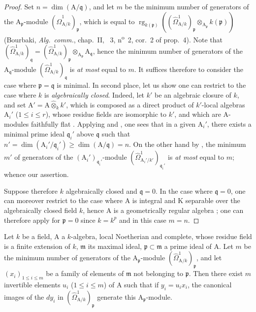 \begin{proof}
Set $n=\dim(\mathrm{A}/\mathfrak{q})$, and let $m$ be the minimum number of generators of the $\mathrm{A}_\mathfrak{p}$-module $(\hat{\Omega}^1_{\mathrm{A}/k})_\mathfrak{p}$, which is equal to $\operatorname{rg}_{k(\mathfrak{p})}((\hat{\Omega}^1_{\mathrm{A}/k})_\mathfrak{p}\otimes_{\mathrm{A}_\mathfrak{p}}k(\mathfrak{p}))$ (Bourbaki, \emph{Alg.\ comm.}, chap.~II, \textsection~3, n\textsuperscript{o}~2, cor.~2 of prop.~4).
Note that $(\hat{\Omega}^1_{\mathrm{A}/k})_\mathfrak{q}=(\hat{\Omega}^1_{\mathrm{A}/k})_\mathfrak{p}\otimes_{\mathrm{A}_\mathfrak{p}}\mathrm{A}_\mathfrak{q}$, hence the minimum number of generators of the $\mathrm{A}_\mathfrak{q}$-module $(\hat{\Omega}^1_{\mathrm{A}/k})_\mathfrak{q}$ is \emph{at most} equal to $m$.
It suffices therefore to consider the case where $\mathfrak{p}=\mathfrak{q}$ is minimal.
In second place, let us show one can restrict to the case where $k$ is \emph{algebraically closed}.
Indeed, let $k'$ be an algebraic closure of $k$, and set $\mathrm{A}'=\mathrm{A}\widehat{\otimes}_kk'$, which is composed as a direct product of $k'$-local algebras $\mathrm{A}_i'$ ($1\leq i\leq r$), whose residue fields are isomorphic to $k'$, and which are $\mathrm{A}$-modules faithfully flat .
Applying  and , one sees that in a given $\mathrm{A}_i'$, there exists a minimal prime ideal $\mathfrak{q}_i'$ above $\mathfrak{q}$ such that $n'=\dim(\mathrm{A}_i'/\mathfrak{q}_i')\geq\dim(\mathrm{A}/\mathfrak{q})=n$.
On the other hand by , the minimum $m'$ of generators of the $(\mathrm{A}_i')_{\mathfrak{q}_i'}$-module $(\hat{\Omega}^1_{\mathrm{A}_i'/k'})_{\mathfrak{q}_i'}$ is \emph{at most} equal to $m$; whence our assertion.

Suppose therefore $k$ algebraically closed and $\mathfrak{q}=0$.
In the case where $\mathfrak{q}=0$, one can moreover restrict to the case where $\mathrm{A}$ is integral and $\mathrm{K}$ separable over the algebraically closed field $k$, hence $\mathrm{A}$ is a geometrically regular algebra ; one can therefore apply  for $\mathfrak{p}=0$ since $k=k^p$ and in this case $m=n$.
\end{proof}

\begin{lemma}[18.11.5.2]
\label{IV.18.11.5.2}
Let $k$ be a field, $\mathrm{A}$ a $k$-algebra, local Noetherian and complete, whose residue field is a finite extension of $k$, $\mathfrak{m}$ its maximal ideal, $\mathfrak{p}\subset\mathfrak{m}$ a prime ideal of $\mathrm{A}$.
Let $m$ be the minimum number of generators of the $\mathrm{A}_\mathfrak{p}$-module $(\hat{\Omega}^1_{\mathrm{A}/k})_\mathfrak{p}$, and let $(x_i)_{1\leq i\leq m}$ be a family of elements of $\mathfrak{m}$ not belonging to $\mathfrak{p}$.
Then there exist $m$ invertible elements $u_i$ ($1\leq i\leq m$) of $\mathrm{A}$ such that if $y_i=u_ix_i$, the canonical images of the $dy_i$ in $(\hat{\Omega}^1_{\mathrm{A}/k})_\mathfrak{p}$ generate this $\mathrm{A}_\mathfrak{p}$-module.
\end{lemma}

